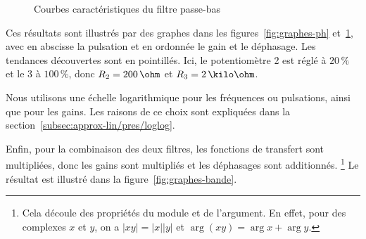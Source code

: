 \begin{figure}[h!]
    \centering
    \qquad
    \caption{Courbes caractéristiques du filtre passe-bas}
    \label{fig:graphes-pb}
\end{figure}

Ces résultats sont illustrés par des graphes dans
les figures~\ref{fig:graphes-ph} et~\ref{fig:graphes-pb},
avec en abscisse la pulsation
et en ordonnée le gain et le déphasage.
Les tendances découvertes sont en pointillés.
Ici, le potentiomètre 2 est réglé à $20\,\%$ et le 3 à $100\,\%$,
donc $R_2 = 200\,\ohm$ et $R_3 = 2\,\kilo\ohm$.

Nous utilisons une échelle logarithmique pour les fréquences
ou pulsations, ainsi que pour les gains.
Les raisons de ce choix sont expliquées dans
la section~\ref{subsec:approx-lin/pres/loglog}.

Enfin, pour la combinaison des deux filtres,
les fonctions de transfert sont multipliées,
donc les gains sont multipliés et les déphasages sont additionnés.%
\footnote{
    Cela découle des propriétés du module et de l'argument.
    En effet, pour des complexes $x$ et $y$,
    on a $|xy| = |x||y|$ et $\arg(xy) = \arg x + \arg y$.
}
Le résultat est illustré dans la figure~\ref{fig:graphes-bande}.

